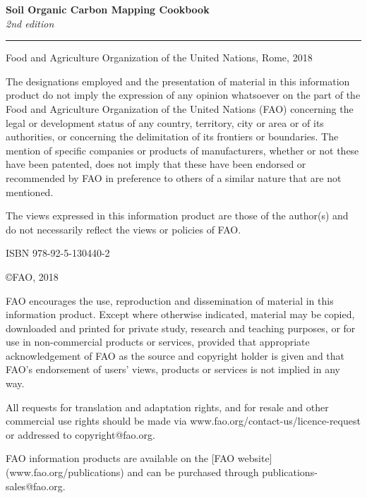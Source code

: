 \pagestyle{plain}

\begin{titlepage}
    \begin{center}
        \vspace*{4cm}
        \Large

        \textcolor{astral}{\textbf{Soil Organic Carbon Mapping Cookbook\\}}
        \vspace{0.5cm}
        \normalsize
        \emph{2nd edition}
        \vfill
        \noindent
        {\color{astral}\rule{\linewidth}{0.5mm} }

        Food and Agriculture Organization of the United Nations, Rome, 2018
    \end{center}
\end{titlepage}

\clearpage
\thispagestyle{empty}

\vfill
{\footnotesize
\vspace*{4cm}
\vfill
The designations employed and the presentation of material in this information product do not imply the expression of any opinion whatsoever on the part of the Food and Agriculture Organization of the United Nations (FAO) concerning the legal or development status of any country, territory, city or area or of its authorities, or concerning the delimitation of its frontiers or boundaries. The mention of specific companies or products of manufacturers, whether or not these have been patented, does not imply that these have been endorsed or recommended by FAO in preference to others of a similar nature that are not mentioned.

The views expressed in this information product are those of the author(s) and do not necessarily reflect the views or policies of FAO.

ISBN 978-92-5-130440-2

\copyright FAO, 2018

FAO encourages the use, reproduction and dissemination of material in this information product. Except where otherwise indicated, material may be copied, downloaded and printed for private study, research and teaching purposes, or for use in non-commercial products or services, provided that appropriate acknowledgement of FAO as the source and copyright holder is given and that FAO’s endorsement of users’ views, products or services is not implied in any way.

All requests for translation and adaptation rights, and for resale and other commercial use rights should be made via www.fao.org/contact-us/licence-request or addressed to copyright@fao.org.


FAO information products are available on the [FAO website](www.fao.org/publications) and can be purchased through publications-sales@fao.org.
}


